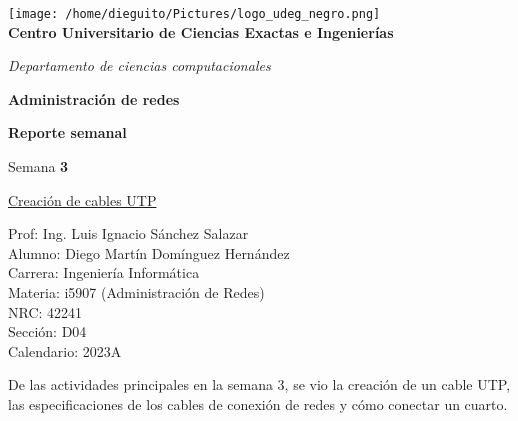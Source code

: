 \documentclass[]{article}
\begin{document}
\begin{titlepage}
\begin{center}
	\texttt{[image: /home/dieguito/Pictures/logo\_udeg\_negro.png]}\\
	\vspace{1cm}
{\Large 	\textbf{Centro Universitario de Ciencias Exactas e Ingenierías}\\}

\vspace{0.5cm}
	
{\large 	\textit{Departamento de ciencias computacionales}\\}
	
	\vspace{1cm}
	
	\textbf{Administración de redes}\\
	
	\vspace{0.5cm}
	
	\textbf{Reporte semanal}\\
	
	\vspace{0.5cm}
	
	Semana \textbf{3}
	
	\vspace{0.5cm}
	
	\underline{Creación de cables UTP}\\
	
	\vspace{1cm}
	
	Prof: Ing. Luis Ignacio Sánchez Salazar\\
	
	Alumno: Diego Martín Domínguez Hernández\\
	
	Carrera: Ingeniería Informática \\
	
	Materia: i5907 (Administración de Redes)\\
	
	NRC: 42241\\
	
	Sección: D04\\

	Calendario: 2023A\\
	
\end{center}
\end{titlepage}
De las actividades principales en la semana 3, se vio la creación
de un cable UTP, las especificaciones de los cables de conexión de
redes y cómo conectar un cuarto.
\end{document}
